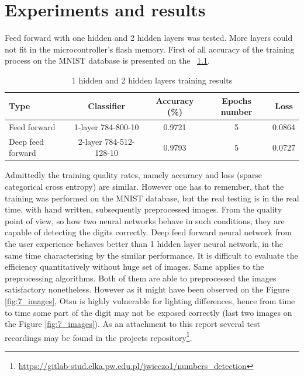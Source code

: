 \chapter{Experiments and results}
\endgroup
Feed forward with one hidden and 2 hidden layers was tested. More layers could not fit in the microcontroller's flash memory. First of all accuracy of the training process on the MNIST database is presented on the \tablename{}~\ref{tab:mnist_comparison2}.
\begin{table}[h!]
\centering
\begin{tabular}{    |l|c|c|c|c|  }
\hline
  Type & Classifier & Accuracy (\%)  & Epochs number & Loss \\
 \hline
   Feed forward & 1-layer 784-800-10 & \num{0.9721} & 5 & \num{0.0864} \\
 \hline
   Deep feed forward & 2-layer 784-512-128-10 & \num{0.9793} & 5 & \num{0.0727} \\
 \hline
\end{tabular}
 \caption{1 hidden and 2 hidden layers training results}
\label{tab:mnist_comparison2}
\end{table}
Admittedly the training quality rates, namely accuracy and loss (sparse categorical cross entropy) are similar. However one has to remember, that the training was performed on the MNIST database, but the real testing is in the real time, with hand written, subsequently preprocessed images. From the quality point of view, so how two neural networks behave in such conditions, they are capable of detecting the digits correctly. Deep feed forward neural network from the user experience behaves better than 1 hidden layer neural network, in the same time characterising by the similar performance. It is difficult to evaluate the efficiency quantitatively without huge set of images. Same applies to the preprocessing algorithms. Both of them are able to preprocessed the images satisfactory nonetheless. However as it might have been observed on the Figure \ref{fig:7_images}, Otsu is highly vulnerable for lighting differences, hence from time to time some part of the digit may not be exposed correctly (last two images on the Figure \ref{fig:7_images}). As an attachment to this report several test recordings may be found in the projects repository\footnote{\url{https://gitlab-stud.elka.pw.edu.pl/jwieczo1/numbers_detection}}.

\begingroup
\renewcommand{\cleardoublepage}{}
\renewcommand{\clearpage}{}
